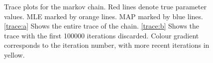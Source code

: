 \documentclass{ieeeaccess}
\theoremstyle{definition}
\begin{document}
\begin{figure}[H]
  \centering

  \caption{Trace plots for the markov chain. Red lines denote true parameter values. MLE marked by orange lines. MAP marked by blue lines. \ref{trace:a} Shows the entire trace of the chain. \ref{trace:b} Shows the trace with the first 100000 iterations discarded. Colour gradient corresponds to the iteration number, with more recent iterations in yellow.}
  \label{fig:trace}
\end{figure}
\end{document}
